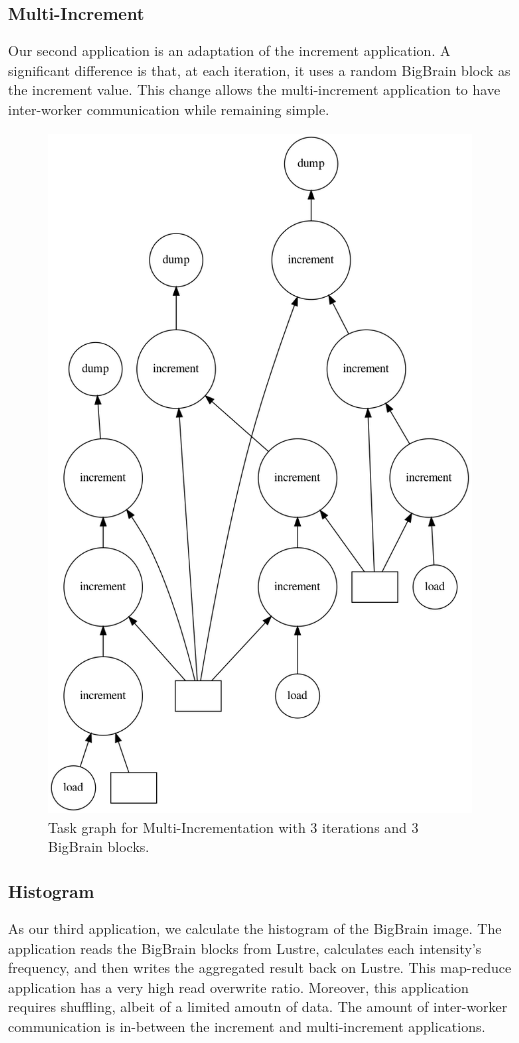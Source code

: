 \documentclass[conference]{IEEEtran}
\begin{document}
% 
\subsubsection{Multi-Increment}
Our second application is an adaptation of the increment application.
A significant difference is that, at each iteration, it uses a random BigBrain block as the increment value. 
This change allows the multi-increment application to have inter-worker communication while remaining simple.

\begin{figure}[!hb]
	\centering
	\includegraphics[height=\columnwidth,
	angle=0]{figures/multi-increment.png}
	\caption{Task graph for Multi-Incrementation with 3 iterations and 3 BigBrain blocks.}
	\label{fig:graph-muti-increment}
\end{figure}
	
\subsubsection{Histogram}
As our third application, we calculate the histogram of the BigBrain image. 
The application reads the BigBrain blocks from Lustre, calculates each intensity's frequency, and then writes the aggregated result back on Lustre.
This map-reduce application has a very high read overwrite ratio.
Moreover, this application requires shuffling, albeit of a limited amoutn of data. 
The amount of inter-worker communication is in-between the increment and multi-increment applications.
\end{document}
